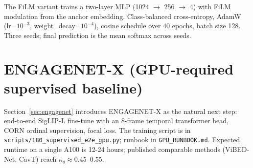 \documentclass{bmvc2k}   %
\begin{document}
The FiLM variant trains a two-layer MLP (1024 $\to$ 256 $\to$ 4) with FiLM
modulation from the anchor embedding. Class-balanced cross-entropy,
AdamW (lr=$10^{-3}$, weight\_decay=$10^{-4}$), cosine schedule over 40
epochs, batch size 128. Three seeds; final prediction is the mean
softmax across seeds.

\section{ENGAGENET-X (GPU-required supervised baseline)}
\label{sec:engagenet-x-supp}

Section~\ref{sec:engagenet} introduces ENGAGENET-X as the natural
next step: end-to-end SigLIP-L fine-tune with an 8-frame temporal
transformer head, CORN ordinal supervision, focal loss. The training
script is in \texttt{scripts/180\_supervised\_e2e\_gpu.py};
runbook in \texttt{GPU\_RUNBOOK.md}. Expected runtime on a single
A100 is 12-24 hours; published comparable methods (ViBED-Net,
CavT) reach $\kappa_q \approx 0.45$--$0.55$.
\end{document}
